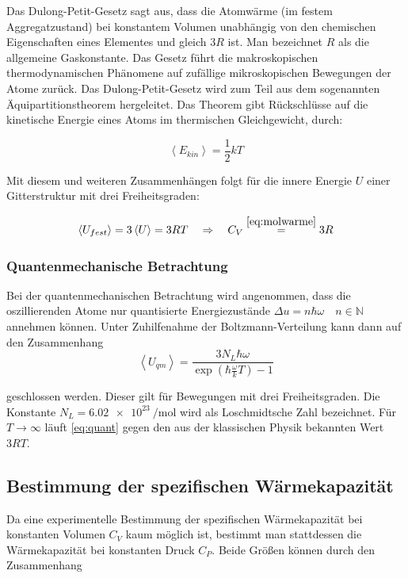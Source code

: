 Das Dulong-Petit-Gesetz sagt aus, dass die Atomwärme (im festem Aggregatzustand) bei %
konstantem Volumen unabhängig von den chemischen Eigenschaften eines Elementes
und gleich $3R$ ist. %
Man bezeichnet $R$ als die allgemeine Gaskonstante. %
Das Gesetz führt die makroskopischen thermodynamischen Phänomene
auf zufällige mikroskopischen Bewegungen der Atome zurück. %
Das Dulong-Petit-Gesetz wird zum Teil aus dem %
sogenannten Äquipartitionstheorem hergeleitet.
Das Theorem gibt Rückschlüsse auf die kinetische Energie eines Atoms %
im thermischen Gleichgewicht, durch:

\begin{equation*}
\left< E_{kin} \right>=\frac{1}{2}kT
\end{equation*}

Mit diesem und weiteren Zusammenhängen folgt für die innere Energie $U$ %
einer Gitterstruktur mit drei Freiheitsgraden:

\begin{equation*}
\left< U_{fest} \right> = 3 \left< U \right>=3RT \quad \Rightarrow \quad C_{V}\overset{\eqref{eq:molwarme}}{=}3R
\end{equation*}

\subsubsection{Quantenmechanische Betrachtung}
Bei der quantenmechanischen Betrachtung wird angenommen,
dass die oszillierenden Atome nur quantisierte Energiezustände $\Delta u=n\hbar \omega \quad n\in\mathbb{N}$
annehmen können.
Unter Zuhilfenahme der Boltzmann-Verteilung kann dann auf den Zusammenhang  %
\begin{equation}
\label{eq:quant}
\left< U_{qm} \right> =\frac{3N_L \hbar \omega}{\exp\left(\hbar \frac{\omega}{k} T\right) -1}
\end{equation}

geschlossen werden. Dieser gilt für Bewegungen mit drei Freiheitsgraden.
Die Konstante $N_L = \SI{6.02e23}{\per\mol}$ wird als Loschmidtsche Zahl bezeichnet.
Für $T\to\infty$ läuft \eqref{eq:quant} gegen den aus der klassischen Physik bekannten Wert %
$3RT$.

\subsection{Bestimmung der spezifischen Wärmekapazität}
Da eine experimentelle Bestimmung der spezifischen Wärmekapazität
bei konstanten Volumen $C_V$ kaum möglich ist, %
bestimmt man stattdessen die Wärmekapazität bei konstanten Druck $C_P$. %
Beide Größen können durch den Zusammenhang %

